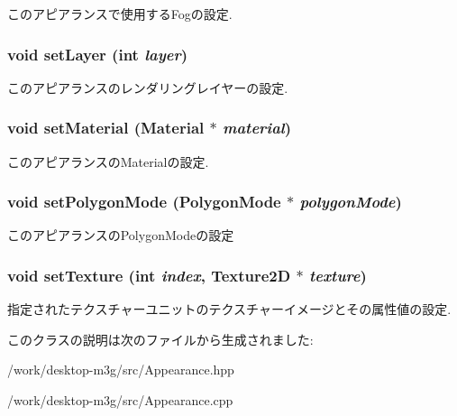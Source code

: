 このアピアランスで使用するFogの設定. \hypertarget{classm3g_1_1Appearance_fbd2fbd594c8ee140b028f505631f682}{
\subsubsection[{setLayer}]{\setlength{\rightskip}{0pt plus 5cm}void setLayer (int {\em layer})}}
\label{classm3g_1_1Appearance_fbd2fbd594c8ee140b028f505631f682}


このアピアランスのレンダリングレイヤーの設定. \hypertarget{classm3g_1_1Appearance_1dfd1a55fa3cc625719dab8e95c8a2de}{
\subsubsection[{setMaterial}]{\setlength{\rightskip}{0pt plus 5cm}void setMaterial ({\bf Material} $\ast$ {\em material})}}
\label{classm3g_1_1Appearance_1dfd1a55fa3cc625719dab8e95c8a2de}


このアピアランスのMaterialの設定. \hypertarget{classm3g_1_1Appearance_cc21fac7868e2ad37e689ac642db1aae}{
\subsubsection[{setPolygonMode}]{\setlength{\rightskip}{0pt plus 5cm}void setPolygonMode ({\bf PolygonMode} $\ast$ {\em polygonMode})}}
\label{classm3g_1_1Appearance_cc21fac7868e2ad37e689ac642db1aae}


このアピアランスのPolygonModeの設定 \hypertarget{classm3g_1_1Appearance_493e54b1c7ab839b9e76b28e0629cf6a}{
\subsubsection[{setTexture}]{\setlength{\rightskip}{0pt plus 5cm}void setTexture (int {\em index}, \/  {\bf Texture2D} $\ast$ {\em texture})}}
\label{classm3g_1_1Appearance_493e54b1c7ab839b9e76b28e0629cf6a}


指定されたテクスチャーユニットのテクスチャーイメージとその属性値の設定. 

このクラスの説明は次のファイルから生成されました:\begin{CompactItemize}
\item 
/work/desktop-m3g/src/Appearance.hpp\item 
/work/desktop-m3g/src/Appearance.cpp\end{CompactItemize}
